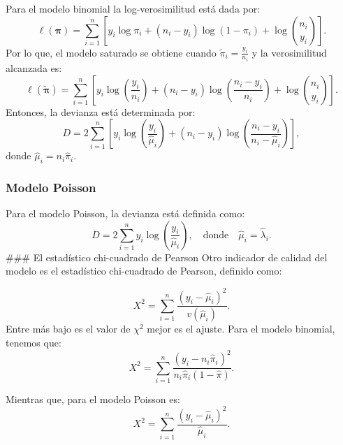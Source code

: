\documentclass[
]{article}
\begin{document}
Para el modelo binomial la log-verosimilitud está dada por:
\[
\ell(\boldsymbol \pi) = \sum_{i=1}^{n}\left[ y_i \log \pi_i + (n_i-y_i)\log (1-\pi_i) + \log {n_i \choose y_i} \right].
\]
Por lo que, el modelo saturado se obtiene cuando \(\tilde{\pi}_i = \frac{y_i}{n_i}\) y la verosimilitud alcanzada es:
\[
\ell(\tilde{\boldsymbol \pi}) = \sum_{i=1}^{n}\left[ y_i \log\left( \frac{y_i}{n_i} \right) + (n_i-y_i)\log\left( \frac{n_i - y_i}{n_i} \right) + \log {n_i \choose y_i} \right].
\]
Entonces, la devianza está determinada por:
\[
D=2\sum_{i=1}^n\left[y_i\log \left(\frac{y_i}{\widehat{\mu}_i}\right)+(n_i-y_i)\log\left(\frac{n_i-y_i}{n_i-\widehat{\mu}_i}\right)\right],
\]
donde \(\widehat{\mu}_i=n_i\widehat{\pi}_i.\)

\subsubsection{Modelo Poisson}\label{modelo-poisson}

Para el modelo Poisson, la devianza está definida como:
\[
D=2\sum_{i=1}^ny_i\log\left(\frac{y_i}{\widehat{\mu}_i}\right), \quad \text{donde} \quad \widehat{\mu}_i=\widehat{\lambda}_i.
\]
\#\#\# El estadístico chi-cuadrado de Pearson
Otro indicador de calidad del modelo es el estadístico chi-cuadrado de Pearson, definido como:

\[
X^2=\sum_{i=1}^n\frac{\left(y_i-\widehat{\mu}_i\right)^2}{v(\widehat{\mu}_i)}.
\]
Entre más bajo es el valor de \(\chi^2\) mejor es el ajuste. Para el modelo binomial, tenemos que:
\[
X^2=\sum_{i=1}^n\frac{(y_i-n_i\hat{\pi}_i)^2}{n_i\hat{\pi}_i(1-\hat{\pi})}.
\]

Mientras que, para el modelo Poisson es:
\[
X^2=\sum_{i=1}^n\frac{(y_i-\widehat{\mu}_i)^2}{\widehat{\mu}_i}.
\]


\end{document}
